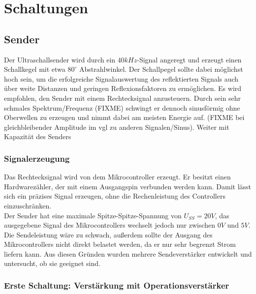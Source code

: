 
\chapter{Schaltungen}


\section{Sender} %
Der Ultraschallsender wird durch ein $40 kHz$-Signal angeregt und erzeugt einen Schallkegel mit etwa $80^\circ$ Abstrahlwinkel. Der Schallpegel sollte dabei möglichst hoch sein, um die erfolgreiche Signalauswertung des reflektierten Signals auch über weite Distanzen und geringen Reflexionsfaktoren zu ermöglichen. Es wird empfohlen, den Sender mit einem Rechtecksignal anzusteuern. Durch sein sehr schmales Spektrum/Frequenz (FIXME) schwingt er dennoch sinusförmig ohne Oberwellen zu erzeugen und nimmt dabei am meisten Energie auf. (FIXME bei gleichbleibender Amplitude im vgl zu anderen Signalen/Sinus). Weiter mit Kapazität des Senders


\subsection{Signalerzeugung}
Das Rechtecksignal wird von dem Mikrocontroller erzeugt. Er besitzt einen Hardwarezähler, der mit einem Ausgangspin verbunden werden kann. Damit lässt sich ein präzises Signal erzeugen, ohne die Rechenleistung des Controllers einzuschränken.\\
Der Sender hat eine maximale Spitze-Spitze-Spannung von $U_{SS} = 20V$, das ausgegebene Signal des Mikrocontrollers wechselt jedoch nur zwischen $0V$ und $5V$. Die Sendeleistung wäre zu schwach, außerdem sollte der Ausgang des Mikrocontrollers nicht direkt belastet werden, da er nur sehr begrenzt Strom liefern kann. Aus diesen Gründen wurden mehrere Sendeverstärker entwickelt und untersucht, ob sie geeignet sind.



\subsection{Erste Schaltung: Verstärkung mit Operationsverstärker}
